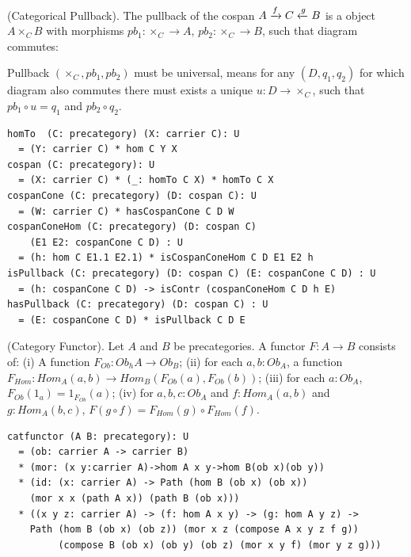 \begin{definition}
\begin{definition} (Categorical Pullback).
The pullback of the cospan $A \xrightarrow{{f}} C \xleftarrow{{g}} B$ is a object $A \times_{C} B$ with
morphisms $pb_1 : \times_C \rightarrow A $, $pb_2 : \times_C \rightarrow B$, such that
diagram commutes:
\begin{center}
\end{center}
Pullback $(\times_C,pb_1,pb_2)$ must be universal, means for any $(D,q_1,q_2)$
for which diagram also commutes there must exists a unique $u: D \rightarrow \times_C$,
such that $pb_1 \circ u = q_1$ and $pb_2 \circ q_2$.
\begin{lstlisting}
homTo  (C: precategory) (X: carrier C): U
  = (Y: carrier C) * hom C Y X
cospan (C: precategory): U
  = (X: carrier C) * (_: homTo C X) * homTo C X
cospanCone (C: precategory) (D: cospan C): U
  = (W: carrier C) * hasCospanCone C D W
cospanConeHom (C: precategory) (D: cospan C)
    (E1 E2: cospanCone C D) : U
  = (h: hom C E1.1 E2.1) * isCospanConeHom C D E1 E2 h
isPullback (C: precategory) (D: cospan C) (E: cospanCone C D) : U
  = (h: cospanCone C D) -> isContr (cospanConeHom C D h E)
hasPullback (C: precategory) (D: cospan C) : U
  = (E: cospanCone C D) * isPullback C D E
\end{lstlisting}
\end{definition}

\begin{definition} (Category Functor).
Let $A$ and $B$ be precategories.
A functor $F : A \rightarrow B$ consists of: (i) A function $F_{Ob}: Ob_hA \rightarrow Ob_B$;
(ii) for each $a,b:Ob_A$, a function $F_{Hom}:Hom_A(a,b)\rightarrow Hom_B(F_{Ob}(a),F_{Ob}(b))$;
(iii) for each $a:Ob_A$, $F_{Ob}(1_a) = 1_{F_{Ob}}(a)$;
(iv) for $a,b,c:Ob_A$ and $f: Hom_A(a,b)$ and $g: Hom_A(b,c)$, $F(g\circ f) = F_{Hom}(g)\circ F_{Hom}(f)$.
\begin{lstlisting}
catfunctor (A B: precategory): U
  = (ob: carrier A -> carrier B)
  * (mor: (x y:carrier A)->hom A x y->hom B(ob x)(ob y))
  * (id: (x: carrier A) -> Path (hom B (ob x) (ob x))
    (mor x x (path A x)) (path B (ob x)))
  * ((x y z: carrier A) -> (f: hom A x y) -> (g: hom A y z) ->
    Path (hom B (ob x) (ob z)) (mor x z (compose A x y z f g))
         (compose B (ob x) (ob y) (ob z) (mor x y f) (mor y z g)))
\end{lstlisting}
\end{definition}


\end{definition}
